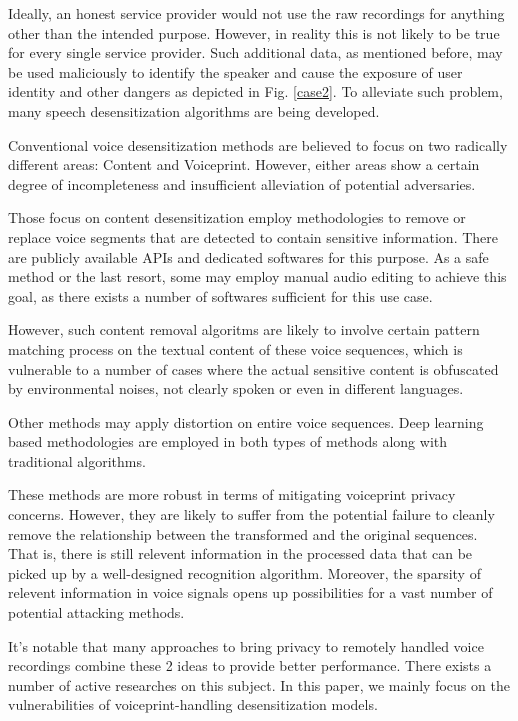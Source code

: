 \documentclass[journal]{IEEEtran} %
\begin{document}
\begin{CJK*}{UTF8}{gbsn}
Ideally, an honest service provider would not use the raw recordings for anything other than the intended purpose. However, in reality this is not likely to be true for every single service provider. Such additional data, as mentioned before, may be used maliciously to identify the speaker and cause the exposure of user identity and other dangers as depicted in Fig. \ref{case2}. To alleviate such problem, many speech desensitization algorithms are being developed.

Conventional voice desensitization methods are believed to focus on two radically different areas: Content and Voiceprint. However, either areas show a certain degree of incompleteness and insufficient alleviation of potential adversaries.

Those focus on content desensitization employ methodologies to remove or replace voice segments that are detected to contain sensitive information. There are publicly available APIs\cite{a13} and dedicated softwares for this purpose\cite{a14}. As a safe method or the last resort, some may employ manual audio editing to achieve this goal, as there exists a number of softwares sufficient for this use case\cite{a15}.

However, such content removal algoritms are likely to involve certain pattern matching process on the textual content of these voice sequences, which is vulnerable to a number of cases where the actual sensitive content is obfuscated by environmental noises, not clearly spoken or even in different languages.

Other methods may apply distortion on entire voice sequences. Deep learning based methodologies are employed in both types of methods along with traditional algorithms\cite{a9, a10, a11}.

These methods are more robust in terms of mitigating voiceprint privacy concerns. However, they are likely to suffer from the potential failure to cleanly remove the relationship between the transformed and the original sequences. That is, there is still relevent information in the processed data that can be picked up by a well-designed recognition algorithm. Moreover, the sparsity of relevent information in voice signals opens up possibilities for a vast number of potential attacking methods.

It's notable that many approaches to bring privacy to remotely handled voice recordings combine these 2 ideas to provide better performance. There exists a number of active researches on this subject\cite{a8}. In this paper, we mainly focus on the vulnerabilities of voiceprint-handling desensitization models.


\end{CJK*}
\end{document}
